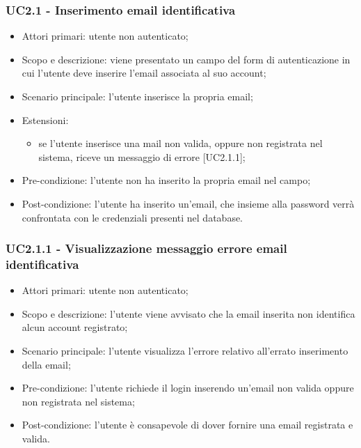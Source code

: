 \subsubsection{UC2.1 - Inserimento email identificativa}
\begin{itemize}
	\item  Attori primari: utente non autenticato;
	\item  Scopo e descrizione: viene presentato un campo del form di autenticazione in cui l'utente deve inserire l'email associata al suo account;
	\item  Scenario principale: l'utente inserisce la propria email;	
	\item  Estensioni:
		   \begin{itemize}
				\item se l'utente inserisce una mail non valida, oppure non registrata nel sistema, riceve un messaggio di errore [UC2.1.1];
		   \end{itemize}
	\item  Pre-condizione: l'utente non ha inserito la propria email nel campo;
	\item  Post-condizione: l'utente ha inserito un'email, che insieme alla password verrà confrontata con le credenziali presenti nel database.
\end{itemize}
\subsubsection{UC2.1.1 - Visualizzazione messaggio errore email identificativa}
\begin{itemize}
	\item  Attori primari: utente non autenticato;
	\item  Scopo e descrizione: l'utente viene avvisato che la email inserita non identifica alcun account registrato;
	\item  Scenario principale: l'utente visualizza l'errore relativo all'errato inserimento della email;
	\item  Pre-condizione: l'utente richiede il login inserendo un'email non valida oppure non registrata nel sistema;
	\item  Post-condizione: l'utente è consapevole di dover fornire una email registrata e valida.
\end{itemize}

